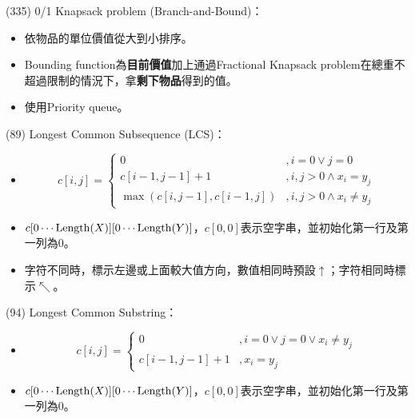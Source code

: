 \item \begin{theorem}{(335)} 0/1 Knapsack problem (Branch-and-Bound)：\begin{itemize}
        \item 依物品的單位價值從大到小排序。
        \item Bounding function為\textbf{目前價值}加上通過Fractional Knapsack problem在總重不超過限制的情況下，拿\textbf{剩下物品}得到的值。
        \item 使用Priority queue。
    \end{itemize}
\end{theorem}

\item \begin{theorem}{(89)} Longest Common Subsequence (LCS)：\begin{itemize}
        \item \begin{equation}
            c[i, j] = \begin{cases}
                0 &, i = 0 \lor j = 0 \\
                c[i - 1, j - 1] + 1 &, i, j > 0 \land x_i = y_j \\
                \max(c[i, j - 1], c[i - 1, j]) &, i, j > 0 \land x_i \neq y_j
            \end{cases}
        \end{equation}
        \item $c[0 \cdots \operatorname{Length}(X)][0 \cdots \operatorname{Length}(Y)]$，$c[0, 0]$表示空字串，並初始化第一行及第一列為$0$。
        \item 字符不同時，標示左邊或上面較大值方向，數值相同時預設$\uparrow$；字符相同時標示$\nwarrow$。
    \end{itemize}
\end{theorem}

\item \begin{theorem}{(94)} Longest Common Substring：\begin{itemize}
        \item \begin{equation}
            c[i, j] = \begin{cases}
                0 &, i = 0 \lor j = 0 \lor x_i \neq y_j \\
                c[i - 1, j - 1] + 1 &, x_i = y_j
            \end{cases}
        \end{equation}
        \item $c[0 \cdots \operatorname{Length}(X)][0 \cdots \operatorname{Length}(Y)]$，$c[0, 0]$表示空字串，並初始化第一行及第一列為$0$。
    \end{itemize}
\end{theorem}

